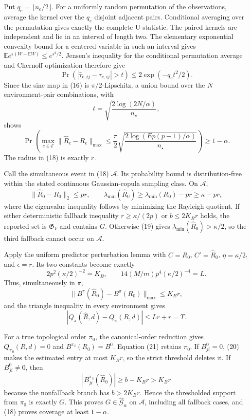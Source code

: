 Put \(q_e=\lfloor n_e/2\rfloor\).  For a uniformly random permutation of the observations, average the kernel over the \(q_e\) disjoint adjacent pairs.  Conditional averaging over the permutation gives exactly the complete U-statistic.  The paired kernels are independent and lie in an interval of length two.  The elementary exponential convexity bound for a centered variable in such an interval gives
\(\mathbb E e^{s(W-\mathbb EW)}\le e^{s^2/2}\).  Jensen's inequality for the conditional permutation average and Chernoff optimization therefore give
\[
 \Pr(|\widehat\tau_{e,ij}-\tau_{e,ij}|>t)
 \le2\exp(-q_et^2/2). \tag{17}
\]
Since the sine map in (16) is \(\pi/2\)-Lipschitz, a union bound over the \(N\) environment-pair combinations, with
\[
 t=\sqrt{\frac{2\log(2N/\alpha)}{n_\star}},
\]
shows
\[
 \Pr\!\left(\max_{e\in\mathcal E}
 \|\widehat R_e-R_e\|_{\max}\le
 \frac{\pi}{2}\sqrt{\frac{2\log(Ep(p-1)/\alpha)}{n_\star}}
 \right)\ge1-\alpha. \tag{18}
\]
The radius in (18) is exactly \(r\).

Call the simultaneous event in (18) \(\mathcal A\).  Its probability bound is distribution-free within the stated continuous Gaussian-copula sampling class.  On \(\mathcal A\),
\[
 \|\widehat R_0-R_0\|_2\le p r,
 \qquad
 \lambda_{\min}(\widehat R_0)
 \ge\lambda_{\min}(R_0)-pr\ge\kappa-pr, \tag{19}
\]
where the eigenvalue inequality follows by minimizing the Rayleigh quotient.  If either deterministic fallback inequality \(r\ge\kappa/(2p)\) or \(b\le2K_Br\) holds, the reported set is \(\mathfrak G_V\) and contains \(G\).  Otherwise (19) gives
\(\lambda_{\min}(\widehat R_0)>\kappa/2\), so the third fallback cannot occur on \(\mathcal A\).

Apply the uniform predictor perturbation lemma with
\(C=R_0\), \(C'=\widehat R_0\), \(\eta=\kappa/2\), and \(\epsilon=r\).  Its two constants become exactly
\[
 2p^2(\kappa/2)^{-2}=K_B,
 \qquad
 14(M/m)p^4(\kappa/2)^{-4}=L.
\]
Thus, simultaneously in \(\pi\),
\[
 \|B^\pi(\widehat R_0)-B^\pi(R_0)\|_{\max}\le K_Br, \tag{20}
\]
and the triangle inequality in every environment gives
\[
 |Q_\pi(\widehat R,d)-Q_\pi(R,d)|
 \le Lr+r=T. \tag{21}
\]

For a true topological order \(\pi_0\), the canonical-order reduction gives
\(Q_{\pi_0}(R,d)=0\) and \(B^{\pi_0}(R_0)=B^0\).  Equation (21) retains \(\pi_0\).  If \(B^0_{ji}=0\), (20) makes the estimated entry at most \(K_Br\), so the strict threshold deletes it.  If \(B^0_{ji}\ne0\), then
\[
 |B^{\pi_0}_{ji}(\widehat R_0)|
 \ge b-K_Br>K_Br
\]
because the nonfallback branch has \(b>2K_Br\).  Hence the thresholded support from \(\pi_0\) is exactly \(G\).  This proves \(G\in\widehat{\mathcal G}_\alpha\) on \(\mathcal A\), including all fallback cases, and (18) proves coverage at least \(1-\alpha\).

